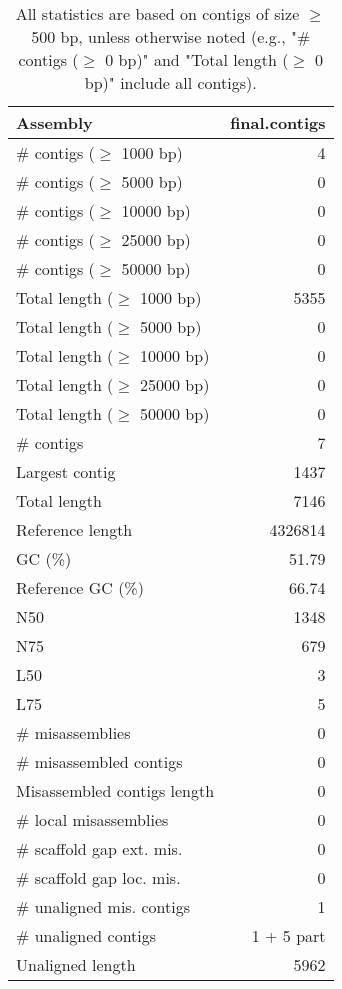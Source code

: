 \documentclass[12pt,a4paper]{article}
\begin{document}
\begin{table}[ht]
\begin{center}
\caption{All statistics are based on contigs of size $\geq$ 500 bp, unless otherwise noted (e.g., "\# contigs ($\geq$ 0 bp)" and "Total length ($\geq$ 0 bp)" include all contigs).}
\begin{tabular}{|l*{1}{|r}|}
\hline
Assembly & final.contigs \\ \hline
\# contigs ($\geq$ 1000 bp) & 4 \\ \hline
\# contigs ($\geq$ 5000 bp) & 0 \\ \hline
\# contigs ($\geq$ 10000 bp) & 0 \\ \hline
\# contigs ($\geq$ 25000 bp) & 0 \\ \hline
\# contigs ($\geq$ 50000 bp) & 0 \\ \hline
Total length ($\geq$ 1000 bp) & 5355 \\ \hline
Total length ($\geq$ 5000 bp) & 0 \\ \hline
Total length ($\geq$ 10000 bp) & 0 \\ \hline
Total length ($\geq$ 25000 bp) & 0 \\ \hline
Total length ($\geq$ 50000 bp) & 0 \\ \hline
\# contigs & 7 \\ \hline
Largest contig & 1437 \\ \hline
Total length & 7146 \\ \hline
Reference length & 4326814 \\ \hline
GC (\%) & 51.79 \\ \hline
Reference GC (\%) & 66.74 \\ \hline
N50 & 1348 \\ \hline
N75 & 679 \\ \hline
L50 & 3 \\ \hline
L75 & 5 \\ \hline
\# misassemblies & 0 \\ \hline
\# misassembled contigs & 0 \\ \hline
Misassembled contigs length & 0 \\ \hline
\# local misassemblies & 0 \\ \hline
\# scaffold gap ext. mis. & 0 \\ \hline
\# scaffold gap loc. mis. & 0 \\ \hline
\# unaligned mis. contigs & 1 \\ \hline
\# unaligned contigs & 1 + 5 part \\ \hline
Unaligned length & 5962 \\ \hline

\end{tabular}
\end{center}
\end{table}
\end{document}
